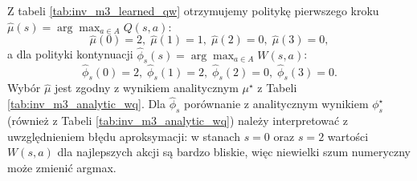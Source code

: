 \begin{table}[h!]
\centering
\caption{Oszacowane wartości $Q(s,a)$ i $W(s,a)$ po zakończeniu uczenia dla modelu zarządzania zapasami ($M=3$), $\alpha=0.35$, $\beta=0.95$.}
\label{tab:inv_m3_learned_qw}
\begin{minipage}[t]{0.49\textwidth}
\centering
{}
\end{minipage}
\hfill
\begin{minipage}[t]{0.49\textwidth}
\centering
{}
\end{minipage}
\end{table}

Z tabeli \ref{tab:inv_m3_learned_qw} otrzymujemy politykę pierwszego kroku $\hat{\mu}(s)=\arg\max_{a\in A} Q(s,a)$:
\[
\hat{\mu}(0)=2,\; \hat{\mu}(1)=1,\; \hat{\mu}(2)=0,\; \hat{\mu}(3)=0,
\]
a dla polityki kontynuacji $\hat{\phi}_s(s)=\arg\max_{a\in A} W(s,a)$:
\[
\hat{\phi}_s(0)=2,\; \hat{\phi}_s(1)=2,\; \hat{\phi}_s(2)=0,\; \hat{\phi}_s(3)=0.
\]
Wybór $\hat{\mu}$ jest zgodny z wynikiem analitycznym $\mu^\star$ z Tabeli \ref{tab:inv_m3_analytic_wq}. Dla $\hat{\phi}_s$ porównanie z analitycznym wynikiem $\phi_s^\star$ (również z Tabeli \ref{tab:inv_m3_analytic_wq}) należy interpretować z uwzględnieniem błędu aproksymacji: w stanach $s=0$ oraz $s=2$ wartości $W(s,a)$ dla najlepszych akcji są bardzo bliskie, więc niewielki szum numeryczny może zmienić argmax.



